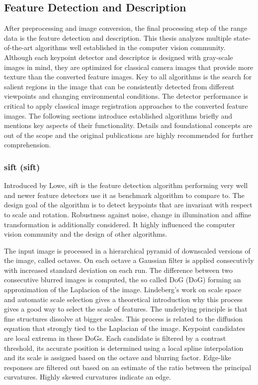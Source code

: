\subsection{Feature Detection and Description}\label{sec:feature_algorithms}

After preprocessing and image conversion, the final processing step of the range data is the feature detection and description.
This thesis analyzes multiple state-of-the-art algorithms well established in the computer vision community.
Although each keypoint detector and descriptor is designed with gray-scale images in mind, they are optimized for classical camera images that provide more texture than the converted feature images.
Key to all algorithms is the search for salient regions in the image that can be consistently detected from different viewpoints and changing environmental conditions.
The detector performance is critical to apply classical image registration approaches to the converted feature images.
The following sections introduce established algorithms briefly and mentions key aspects of their functionality.
Details and foundational concepts are out of the scope and the original publications are highly recommended for further comprehension.

\subsubsection{\acrshort{sift} (\acrlong{sift})}

Introduced by Lowe\cite{lowe_iccv99,lowe_ijcv04}, \acrshort{sift} is the feature detection algorithm performing very well and newer feature detectors use it as benchmark algorithm to compare to.
The design goal of the algorithm is to detect keypoints that are invariant with respect to scale and rotation.
Robustness against noise, change in illumination and affine transformation is additionally considered.
It highly influenced the computer vision community and the design of other algorithms.

The input image is processed in a hierarchical pyramid of downscaled versions of the image, called octaves.
On each octave a Gaussian filter is applied consecutivly with increased standard deviation on each run.
The difference between two consecutive blurred images is computed, the so called \acrlong{DoG} (\acrshort{DoG}) forming an approximation of the Laplacion of the image.
Lindeberg's\cite{lindeberg_ijcv98} work on scale space and automatic scale selection gives a theoretical introduction why this process gives a good way to select the scale of features.
The underlying principle is that fine structures dissolve at bigger scales.
This process is related to the diffusion equation that strongly tied to the Laplacian of the image.
Keypoint candidates are local extrema in these \acrshort{DoG}s.
Each candidate is filtered by a contrast threshold, its accurate position is determined using a local spline interpolation and its scale is assigned based on the octave and blurring factor.
Edge-like responses are filtered out based on an estimate of the ratio between the principal curvatures.
Highly skewed curvatures indicate an edge.

